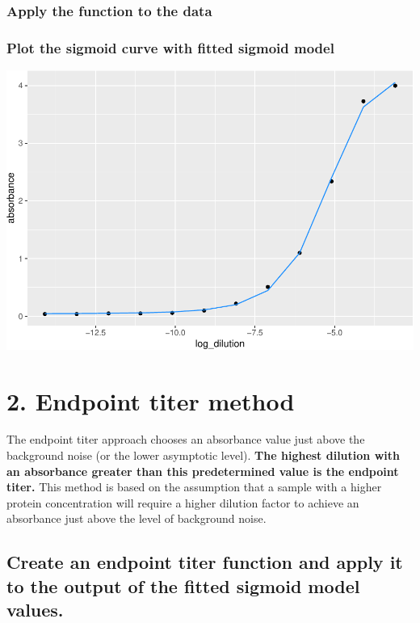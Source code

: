 \documentclass[
]{book}
\begin{document}
\subsubsection{Apply the function to the data}\label{apply-the-function-to-the-data}

\subsubsection{Plot the sigmoid curve with fitted sigmoid model}\label{plot-the-sigmoid-curve-with-fitted-sigmoid-model}

\includegraphics{csu-impactb_files/figure-latex/unnamed-chunk-44-1.pdf}

\section{2. Endpoint titer method}\label{endpoint-titer-method}

The endpoint titer approach chooses an absorbance value just above the background noise (or the lower asymptotic level). \textbf{The highest dilution with an absorbance greater than this predetermined value is the endpoint titer.} This method is based on the assumption that a sample with a higher protein concentration will require a higher dilution factor to achieve an absorbance just above the level of background noise.

\subsection{Create an endpoint titer function and apply it to the output of the fitted sigmoid model values.}\label{create-an-endpoint-titer-function-and-apply-it-to-the-output-of-the-fitted-sigmoid-model-values.}
\end{document}
